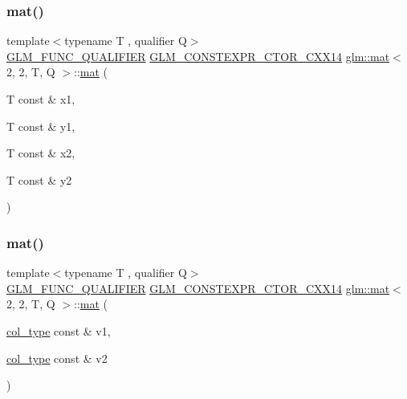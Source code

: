 \subsubsection{\texorpdfstring{mat()}{mat()}\hspace{0.1cm}{\footnotesize\ttfamily [5/21]}}
{\footnotesize\ttfamily template$<$typename T , qualifier Q$>$ \\
\mbox{\hyperlink{setup_8hpp_a33fdea6f91c5f834105f7415e2a64407}{G\+L\+M\+\_\+\+F\+U\+N\+C\+\_\+\+Q\+U\+A\+L\+I\+F\+I\+ER}} \mbox{\hyperlink{setup_8hpp_a0900f9145e68bf6061b6f5e7be3fa751}{G\+L\+M\+\_\+\+C\+O\+N\+S\+T\+E\+X\+P\+R\+\_\+\+C\+T\+O\+R\+\_\+\+C\+X\+X14}} \mbox{\hyperlink{structglm_1_1mat}{glm\+::mat}}$<$ 2, 2, T, Q $>$\+::\mbox{\hyperlink{structglm_1_1mat}{mat}} (\begin{DoxyParamCaption}\item[{T const \&}]{x1,  }\item[{T const \&}]{y1,  }\item[{T const \&}]{x2,  }\item[{T const \&}]{y2 }\end{DoxyParamCaption})}

\mbox{\label{structglm_1_1mat_3_012_00_012_00_01_t_00_01_q_01_4_aad5bc3eb3a2e58e760d65e8c5fa66427}} 
\subsubsection{\texorpdfstring{mat()}{mat()}\hspace{0.1cm}{\footnotesize\ttfamily [6/21]}}
{\footnotesize\ttfamily template$<$typename T , qualifier Q$>$ \\
\mbox{\hyperlink{setup_8hpp_a33fdea6f91c5f834105f7415e2a64407}{G\+L\+M\+\_\+\+F\+U\+N\+C\+\_\+\+Q\+U\+A\+L\+I\+F\+I\+ER}} \mbox{\hyperlink{setup_8hpp_a0900f9145e68bf6061b6f5e7be3fa751}{G\+L\+M\+\_\+\+C\+O\+N\+S\+T\+E\+X\+P\+R\+\_\+\+C\+T\+O\+R\+\_\+\+C\+X\+X14}} \mbox{\hyperlink{structglm_1_1mat}{glm\+::mat}}$<$ 2, 2, T, Q $>$\+::\mbox{\hyperlink{structglm_1_1mat}{mat}} (\begin{DoxyParamCaption}\item[{\mbox{\hyperlink{structglm_1_1mat_3_012_00_012_00_01_t_00_01_q_01_4_a2983591534ee443dd378cedcbe771749}{col\+\_\+type}} const \&}]{v1,  }\item[{\mbox{\hyperlink{structglm_1_1mat_3_012_00_012_00_01_t_00_01_q_01_4_a2983591534ee443dd378cedcbe771749}{col\+\_\+type}} const \&}]{v2 }\end{DoxyParamCaption})}

